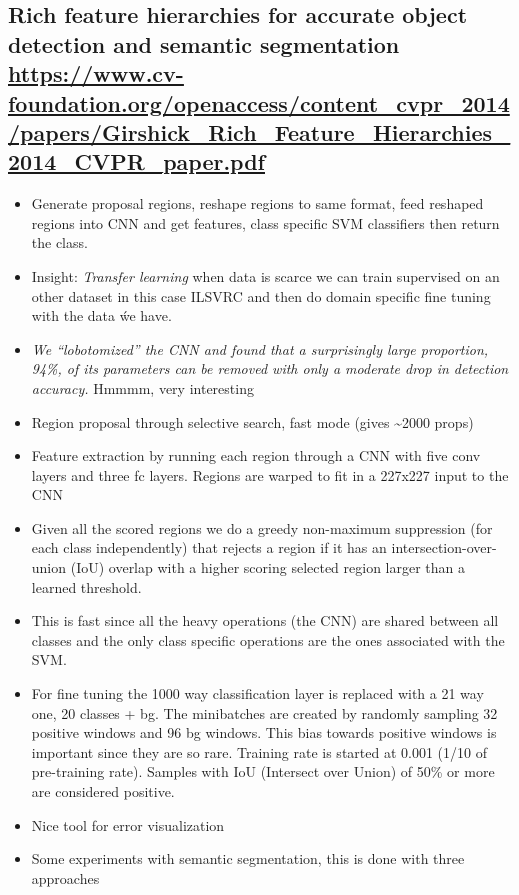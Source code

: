 \documentclass[11pt]{article}
\begin{document}
\subsection{Rich feature hierarchies for accurate object detection and semantic segmentation \url{https://www.cv-foundation.org/openaccess/content\_cvpr\_2014/papers/Girshick\_Rich\_Feature\_Hierarchies\_2014\_CVPR\_paper.pdf}}
\label{sec:orgab851d7}
\begin{itemize}
\item Generate proposal regions, reshape regions to same format, feed reshaped regions into CNN and get features, class specific SVM classifiers then return the class.
\item Insight: \emph{Transfer learning} when data is scarce we can train supervised on an other dataset in this case ILSVRC and then do domain specific fine tuning with the data ẃe have.
\item \emph{We “lobotomized” the CNN and found that a surprisingly large proportion, 94\%, of its parameters can be removed with only a moderate drop in detection accuracy.} Hmmmm, very interesting
\item Region proposal through selective search, fast mode (gives \textasciitilde{}2000 props)
\item Feature extraction by running each region through a CNN with five conv layers and three fc layers. Regions are warped to fit in a 227x227 input to the CNN
\item Given all the scored regions we do  a greedy non-maximum suppression (for each class independently) that rejects a region if it has an intersection-over-union (IoU) overlap with a higher scoring selected region larger than a learned threshold.
\item This is fast since all the heavy operations (the CNN) are shared between all classes and the only class specific operations are the ones associated with the SVM.
\item For fine tuning the 1000 way classification layer is replaced with a 21 way one, 20 classes + bg. The minibatches are created by randomly sampling 32 positive windows and 96 bg windows. This bias towards positive windows is important since they are so rare. Training rate is started at 0.001 (1/10 of pre-training rate). Samples with IoU (Intersect over Union) of 50\% or more are considered positive.
\item Nice tool for error visualization
\item Some experiments with semantic segmentation, this is done with three approaches

\end{itemize}
\end{document}
